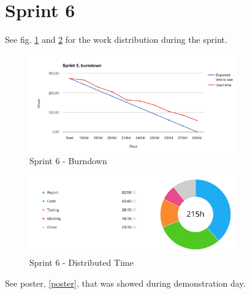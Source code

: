 \section{Sprint 6}
\label{Sprints-sprint6}

See fig. \ref{sprint6_burndown} and \ref{sprint6_diagram} for the work distribution during the sprint. 

\begin{figure}[ht]
\centering
    \includegraphics[width=0.8\textwidth]{fig/sprint5}
\caption{Sprint 6 - Burndown}
\label{sprint6_burndown}
\end{figure}

\begin{figure}[ht]
\centering
    \includegraphics[width=0.8\textwidth]{fig/sprint5-diagram}
\caption{Sprint 6 - Distributed Time}
\label{sprint6_diagram}
\end{figure}

See poster, \ref{poster}, that was showed during demonstration day. 

